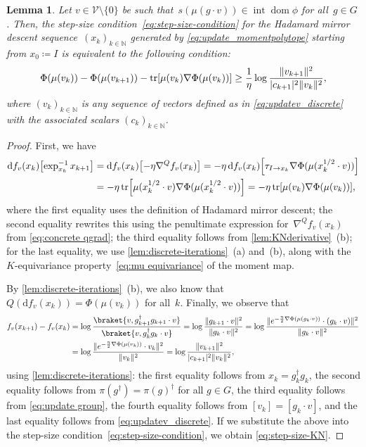 \documentclass[11pt,letterpaper]{article}
\newtheorem{lemma}[theorem]{Lemma}\AddToHook{env/lemma/begin}{\crefalias{theorem}{lemma}}
\numberwithin{equation}{section}
\newcommand{\NN}{\mathbb{N}}
\newcommand{\diff}{\mathrm{d}}
\newcommand{\VV}{\mathcal{V}}
\DeclareMathOperator{\intr}{int}
\DeclareMathOperator{\dom}{dom}
\DeclareMathOperator{\tr}{tr}
\begin{document}
\begin{lemma}
Let $v \in\VV\setminus\{0\}$ be such that~$s(\mu(g\cdot v)) \in \intr\dom\phi$ for all~$g \in G$.
Then, the step-size condition~\eqref{eq:step-size-condition} for the Hadamard mirror descent sequence~$(x_k)_{k\in\NN}$ generated by \eqref{eq:update_momentpolytope} starting from $x_0 \coloneqq I$ is equivalent to the following condition:
\begin{equation}\label{eq:step-size-KN}
    \Phi(\mu(v_k)) - \Phi(\mu(v_{k+1})) - \tr\mleft[ \mu(v_k) \nabla\Phi(\mu(v_k)) \mright]
    \geq \frac1\eta \log\frac{\|v_{k+1}\|^2}{|c_{k+1}|^2\|v_k\|^2},
\end{equation}
where $(v_k)_{k \in \NN}$ is any sequence of vectors defined as in \cref{eq:updatev_discrete} with the associated scalars $(c_k)_{k \in \NN}$.
\end{lemma}
\begin{proof}
First, we have
\begin{align*}
    \diff f_v(x_k)\mleft[ \exp_{x_k}^{-1}x_{k+1} \mright]
&= \diff f_v(x_k)\mleft[ -\eta\nabla^Q f_v(x_k) \mright]
= -\eta \, \diff f_v(x_k) \mleft[ \tau_{I\to x_k} \nabla \Phi(\mu(x_k^{1/2} \cdot v)) \mright] \\
&= -\eta \tr\mleft[ \mu(x_k^{1/2} \cdot v) \nabla \Phi(\mu(x_k^{1/2} \cdot v)) \mright]
= -\eta \tr\mleft[ \mu(v_k) \nabla \Phi(\mu(v_k)) \mright],
\end{align*}
where the first equality uses the definition of Hadamard mirror descent;
the second equality rewrites this using the penultimate expression for~$\nabla^Q f_v(x_k)$ from \cref{eq:concrete qgrad};
the third equality follows from \cref{lem:KNderivative}~(b);
for the last equality, we use \cref{lem:discrete-iterations}~(a) and~(b), along with the $K$-equivariance property~\eqref{eq:mu equivariance} of the moment map.

By \cref{lem:discrete-iterations}~(b), we also know that $Q(\diff f_v(x_k)) = \Phi(\mu(v_k))$ for all~$k$.
Finally, we observe that
\begin{align*}
    f_v(x_{k+1}) - f_v(x_k)
&= \log \frac {\braket{v, g_{k+1}^\dagger g_{k+1} \cdot v}}  {\braket{v, g_k^\dagger g_k \cdot v}}
= \log \frac {\|g_{k+1}\cdot v\|^2}  {\|g_k\cdot v\|^2}
= \log \frac {\|e^{-\frac\eta2\nabla\Phi(\mu(g_k\cdot v))}\cdot(g_k\cdot v)\|^2}  {\|g_k\cdot v\|^2}\\
&= \log \frac {\|e^{-\frac\eta2\nabla\Phi(\mu(v_k))}\cdot v_k\|^2}  {\|v_k\|^2}
= \log \frac {\|v_{k+1}\|^2}  {|c_{k+1}|^2\|v_k\|^2},
\end{align*}
using \cref{lem:discrete-iterations}: the first equality follows from $x_k = g_k^\dagger g_k$, the second equality follows from $\pi(g^\dagger) = \pi(g)^\dagger$ for all $g \in G$, the third equality follows from \cref{eq:update group}, the fourth equality follows from $[v_k] = [g_k \cdot v]$, and the last equality follows from \cref{eq:updatev_discrete}.
If we substitute the above into the step-size condition~\eqref{eq:step-size-condition}, we obtain \cref{eq:step-size-KN}.
\end{proof}
\end{document}
